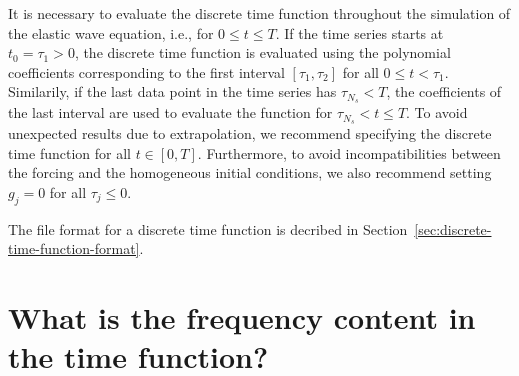 \documentclass[11pt]{report}
\begin{document}
It is necessary to evaluate the discrete time function throughout the simulation of the elastic wave
equation, i.e., for $0\leq t\leq T$. If the time series starts at $t_0=\tau_1>0$, the discrete time
function is evaluated using the polynomial coefficients corresponding to the first interval
$[\tau_1,\tau_2]$ for all $0\leq t<\tau_1$. Similarily, if the last data point in the time series
has $\tau_{N_s}<T$, the coefficients of the last interval are used to evaluate the function for
$\tau_{N_s}<t\leq T$. To avoid unexpected results due to extrapolation, we recommend specifying the
discrete time function for all $t\in[0,T]$. Furthermore, to avoid incompatibilities between the
forcing and the homogeneous initial conditions, we also recommend setting $g_j=0$ for all
$\tau_j\leq 0$.

The file format for a discrete time function is decribed in
Section~\ref{sec:discrete-time-function-format}.


\section{What is the frequency content in the time function?}\label{sec:freq}
\end{document}
